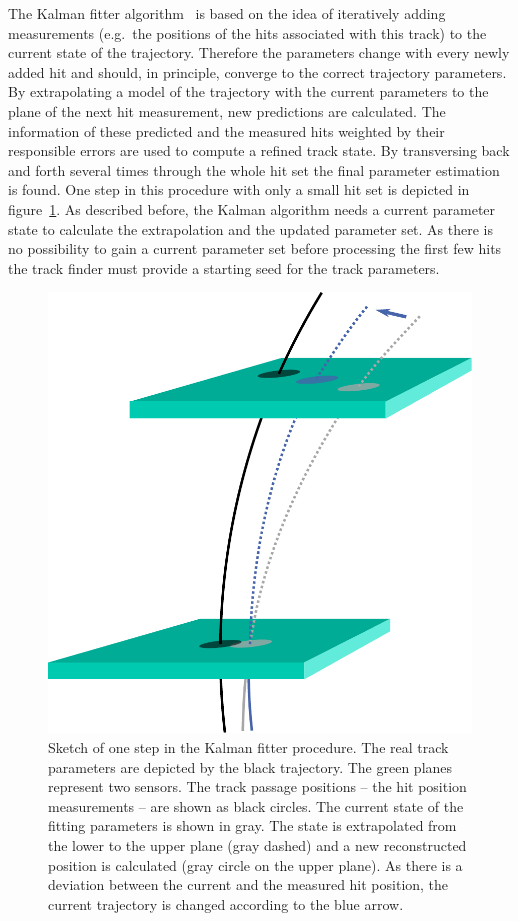 The Kalman fitter algorithm~\cite{kalman} is based on the idea of iteratively adding measurements (e.g.\ the positions of the hits associated with this track) to the current state of the trajectory. Therefore the parameters change with every newly added hit and should, in principle, converge to the correct trajectory parameters. By extrapolating a model of the trajectory with the current parameters to the plane of the next hit measurement, new predictions are calculated. The information of these predicted and the measured hits weighted by their responsible errors are used to compute a refined track state. By transversing back and forth several times through the whole hit set the final parameter estimation is found. One step in this procedure with only a small hit set is depicted in figure~\ref{fig-kalman}. As described before, the Kalman algorithm needs a current parameter state to calculate the extrapolation and the updated parameter set. As there is no possibility to gain a current parameter set before processing the first few hits the track finder must provide a starting seed for the track parameters.

\begin{figure}
 \centering
 \includegraphics[width=0.6\linewidth]{figures/theory/kalman.pdf}
 \caption[One step of the Kalman fitter procedure.]{Sketch of one step in the Kalman fitter procedure. The real track parameters are depicted by the black trajectory. The green planes represent two sensors. The track passage positions -- the hit position measurements -- are shown as black circles. The current state of the fitting parameters is shown in gray. The state is extrapolated from the lower to the upper plane (gray dashed) and a new reconstructed position is calculated (gray circle on the upper plane). As there is a deviation between the current and the measured hit position, the current trajectory is changed according to the blue arrow.}
 \label{fig-kalman}
\end{figure}

